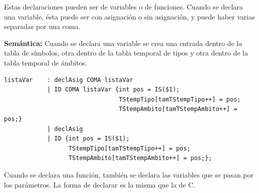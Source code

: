 \documentclass[a4paper,12pt]{article}
\begin{document}
\begin{enumerate}
\begin{enumerate}
\begin{itemize}
\begin{lstlisting}
   \end{lstlisting}
   Estas declaraciones pueden ser de variables o de funciones. Cuando se declara una variable, ésta puede ser con asignación o sin asignación, y puede haber varias
   separadas por una coma.
   
   \textbf{Semántica:} Cuando se declara una variable se crea una entrada dentro de la tabla de símbolos, otra dentro de la tabla 
   temporal de tipos y otra dentro de la tabla temporal de ámbitos.
   \begin{lstlisting}
listaVar 	: declAsig COMA listaVar
			| ID COMA listaVar {int pos = IS($1); 
								TStempTipo[tamTStempTipo++] = pos;
								TStempAmbito[tamTStempAmbito++] = pos;}
			| declAsig
			| ID {int pos = IS($1);
				  TStempTipo[tamTStempTipo++] = pos;
				  TStempAmbito[tamTStempAmbito++] = pos;};
   \end{lstlisting}
   Cuando se declara una función, también se declara las variables que se pasan por los parámetros. La forma de declarar es la misma que la de C.
   

\end{itemize}
\end{enumerate}
\end{enumerate}
\end{document}
